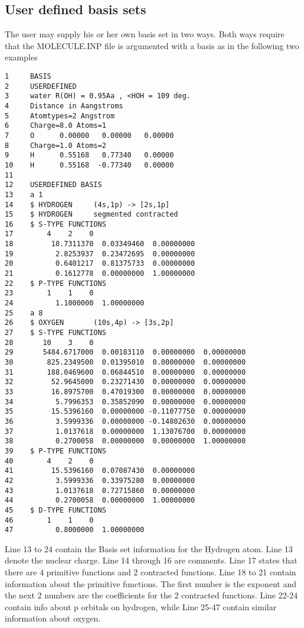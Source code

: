 \subsection{User defined basis sets}
\label{sub:USERDEFINER}

The user may supply his or her own basis set in two ways. Both ways require that the MOLECULE.INP file is argumented with a basis as in the following two examples

\begin{verbatim}
1     BASIS
2     USERDEFINED
3     water R(OH) = 0.95Aa , <HOH = 109 deg.
4     Distance in Aangstroms
5     Atomtypes=2 Angstrom
6     Charge=8.0 Atoms=1
7     O      0.00000   0.00000   0.00000
8     Charge=1.0 Atoms=2
9     H      0.55168   0.77340   0.00000
10    H      0.55168  -0.77340   0.00000
11 
12    USERDEFINED BASIS
13    a 1
14    $ HYDROGEN     (4s,1p) -> [2s,1p]
15    $ HYDROGEN     segmented contracted
16    $ S-TYPE FUNCTIONS
17        4    2    0
18         18.7311370  0.03349460  0.00000000
19          2.8253937  0.23472695  0.00000000
20          0.6401217  0.81375733  0.00000000
21          0.1612778  0.00000000  1.00000000
22    $ P-TYPE FUNCTIONS
23        1    1    0
24          1.1000000  1.00000000
25    a 8
26    $ OXYGEN       (10s,4p) -> [3s,2p]                               
27    $ S-TYPE FUNCTIONS
28       10    3    0
29       5484.6717000  0.00183110  0.00000000  0.00000000
30        825.2349500  0.01395010  0.00000000  0.00000000
31        188.0469600  0.06844510  0.00000000  0.00000000
32         52.9645000  0.23271430  0.00000000  0.00000000
33         16.8975700  0.47019300  0.00000000  0.00000000
34          5.7996353  0.35852090  0.00000000  0.00000000
35         15.5396160  0.00000000 -0.11077750  0.00000000
36          3.5999336  0.00000000 -0.14802630  0.00000000
37          1.0137618  0.00000000  1.13076700  0.00000000
38          0.2700058  0.00000000  0.00000000  1.00000000
39    $ P-TYPE FUNCTIONS
40        4    2    0
41         15.5396160  0.07087430  0.00000000
42          3.5999336  0.33975280  0.00000000
43          1.0137618  0.72715860  0.00000000
44          0.2700058  0.00000000  1.00000000
45    $ D-TYPE FUNCTIONS
46        1    1    0
47          0.8000000  1.00000000
\end{verbatim} 
Line 13 to 24 contain the Basis set information for the Hydrogen atom. 
Line 13 denote the nuclear charge. Line 14 through 16 are comments. Line 17 states 
that there are 4 primitive functions and 2 contracted functions.
Line 18 to 21 contain information about the primitive functions. The first number is the exponent 
and the next 2 numbers are the coefficients for the 2 contracted functions.
Line 22-24 contain info about p orbitals on hydrogen, while Line 25-47 contain similar information 
about oxygen.

